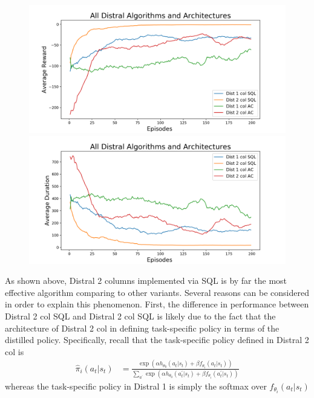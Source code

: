 \documentclass[12pt]{report}
\begin{document}
\begin{figure}[H]
\centering
\begin{minipage}{.5\textwidth}
\centering
\includegraphics[width=\textwidth]{figs/all_algos_rwd.png}
\end{minipage}%
\centering
\begin{minipage}{.5\textwidth}
\centering
\includegraphics[width=\textwidth]{figs/all_algos_dur.png}
\end{minipage}%
\end{figure}

As shown above, Distral 2 columns implemented via SQL is by far the most effective algorithm comparing to other variants. Several reasons can be considered in order to explain this phenomenon. First, the difference in performance between Distral 2 col SQL and Distral 2 col SQL is likely due to the fact that the architecture of Distral 2 col in defining task-specific policy in terms of the distilled policy. Specifically, recall that the task-specific policy defined in Distral 2 col is 
\begin{align}
\hat{\pi}_i(a_t|s_t) &= \frac{\exp(\alpha h_{\theta_0}(a_t| s_t) + \beta f_{\theta_i}(a_t | s_t))}{\sum_{a^\prime}\exp(\alpha h_{\theta_0}(a^\prime_t | s_t) + \beta f_{\theta_i}(a^\prime _t | s_t))} \nonumber
\end{align}
whereas the task-specific policy in Distral 1 is simply the softmax over $f_{\theta_i}(a_t | s_t)$
\end{document}
